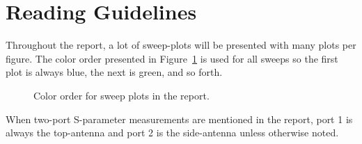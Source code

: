 \section{Reading Guidelines}
Throughout the report, a lot of sweep-plots will be presented with many plots per figure. The color order presented in Figure~\ref{fig:colororder} is used for all sweeps so the first plot is always blue, the next is green, and so forth.

\begin{figure}[htbp]
    \centering
    \caption{Color order for sweep plots in the report.}
    \label{fig:colororder}
\end{figure}

When two-port S-parameter measurements are mentioned in the report, port 1 is always the top-antenna and port 2 is the side-antenna unless otherwise noted.

